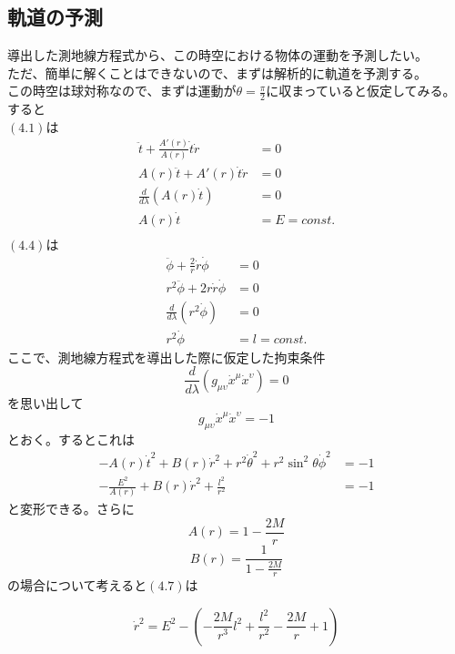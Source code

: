 \documentclass[dvipdfmx]{report} %
\begin{document}
\subsection{
	軌道の予測
}
導出した測地線方程式から、この時空における物体の運動を予測したい。\\
ただ、簡単に解くことはできないので、まずは解析的に軌道を予測する。\\
この時空は球対称なので、まずは運動が$\theta = \frac{\pi}{2}$に収まっていると仮定してみる。\\
 すると\\
 $(4.1)$は
\begin{equation}
\begin{split}
\ddot{t} + \frac{A'(r)}{A(r)} \dot{t} \dot{r} &= 0\\
A(r) \ddot{t} + A'(r) \dot{t} \dot{r} &= 0\\
\frac{d}{d \lambda} \left( A(r) \dot{t} \right) &= 0\\
A(r) \dot{t} &= E = const.\\
\end{split}
\end{equation}
$(4.4)$は
\begin{equation}
\begin{split}
\ddot{\phi} + \frac{2}{r} \dot{r} \dot{\phi} &= 0\\
r^2 \ddot{\phi} + 2 r \dot{r} \dot{\phi} &= 0\\
\frac{d}{d \lambda} \left( r^2 \dot{\phi} \right) &= 0\\
r^2 \dot{\phi} &= l = const.
\end{split}
\end{equation}
ここで、測地線方程式を導出した際に仮定した拘束条件
\[
\frac{ d }{ d \lambda }\left( g_{\mu \upsilon}\dot{x}^{\mu}  \dot{x}^{\upsilon} \right) = 0
\]
を思い出して
\[
g_{\mu \upsilon}\dot{x}^{\mu}  \dot{x}^{\upsilon} = -1
\]
とおく。するとこれは
\begin{equation}
\begin{split}
-A(r) \dot{t}^2 + B(r) \dot{r}^2 + r^2 \dot{\theta}^2 + r^2 \sin^2 \theta \dot{\phi}^2 &= -1\\
- \frac{E^2}{A(r)} + B(r) \dot{r}^2 + \frac{l^2}{r^2} &= -1
\end{split}
\end{equation}
と変形できる。さらに
\[
A(r) = 1- \frac{2M}{r}
\]
\[
B(r) = \frac{1}{1- \frac{2M}{r}}
\]
の場合について考えると$(4.7)$は
\begin{tcolorbox}
\[
\dot{r}^2 = E^2 - \left( - \frac{2M}{r^3} l^2 + \frac{l^2}{r^2} - \frac{2M}{r} + 1 \right)
\]
\end{tcolorbox}
\end{document}
